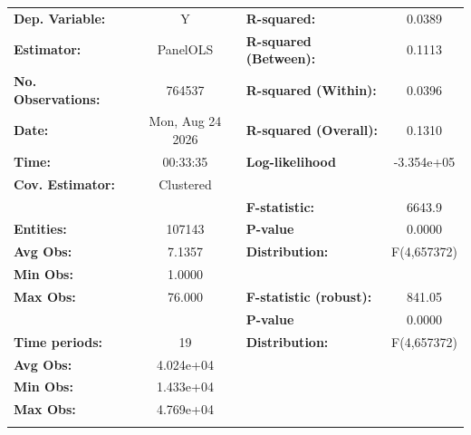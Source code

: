 \begin{center}
\begin{tabular}{lclc}
\toprule
\textbf{Dep. Variable:}         &         Y          & \textbf{  R-squared:         }   &      0.0389      \\
\textbf{Estimator:}             &      PanelOLS      & \textbf{  R-squared (Between):}  &      0.1113      \\
\textbf{No. Observations:}      &       764537       & \textbf{  R-squared (Within):}   &      0.0396      \\
\textbf{Date:}                  &  Mon, Aug 24 2026  & \textbf{  R-squared (Overall):}  &      0.1310      \\
\textbf{Time:}                  &      00:33:35      & \textbf{  Log-likelihood     }   &    -3.354e+05    \\
\textbf{Cov. Estimator:}        &     Clustered      & \textbf{                     }   &                  \\
\textbf{}                       &                    & \textbf{  F-statistic:       }   &      6643.9      \\
\textbf{Entities:}              &       107143       & \textbf{  P-value            }   &      0.0000      \\
\textbf{Avg Obs:}               &       7.1357       & \textbf{  Distribution:      }   &   F(4,657372)    \\
\textbf{Min Obs:}               &       1.0000       & \textbf{                     }   &                  \\
\textbf{Max Obs:}               &       76.000       & \textbf{  F-statistic (robust):} &      841.05      \\
\textbf{}                       &                    & \textbf{  P-value            }   &      0.0000      \\
\textbf{Time periods:}          &         19         & \textbf{  Distribution:      }   &   F(4,657372)    \\
\textbf{Avg Obs:}               &     4.024e+04      & \textbf{                     }   &                  \\
\textbf{Min Obs:}               &     1.433e+04      & \textbf{                     }   &                  \\
\textbf{Max Obs:}               &     4.769e+04      & \textbf{                     }   &                  \\
\textbf{}                       &                    & \textbf{                     }   &                  \\

\end{tabular}
\end{center}
